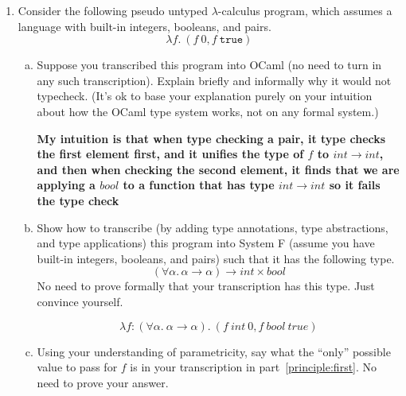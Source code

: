 \documentclass{article}
\theoremstyle{definition}
\newcommand{\meta}[1]{{\color{blue}#1}}
\begin{document}
\begin{enumerate}[start=1,label={{\bf Problem \arabic*}.},ref=\arabic*,left=0pt..0pt,widest*=10,align=left,itemindent=*]
\begin{proof}
\begin{itemize}
    \end{itemize}
  \end{proof}
  \begin{quote}
    If $\cdot;\cdot\vdash\meta{e}:\meta{\tau}$, then $FTV(\meta{\tau}) = \emptyset$.
  \end{quote}
  \begin{proof}
    Suppose $FTV(\meta{\tau}) \neq \emptyset$, then $\exists \meta{\beta} \in FTV(\meta{\tau})$. According to $\textit{Lemma 1-1}$, $\cdot\vdash\meta{\beta}$. However, $\meta{\Delta}$ in this case is an empty set, this contradicts with $\cdot\vdash\meta{\beta}$. Therefore, $FTV(\meta{\tau})$ must be $\emptyset$.
  \end{proof}

\item Consider the following pseudo untyped $\lambda$-calculus program, which assumes a language with built-in integers, booleans, and pairs.
  \[
    \lambda f.\ (f\ 0, f\ \mathtt{true})
  \]
  \begin{enumerate}[(a),left=1em]
  \item Suppose you transcribed this program into OCaml (no need to turn in any
    such transcription). Explain briefly and informally why it would not
    typecheck. (It's ok to base your explanation purely on your intuition about
    how the OCaml type system works, not on any formal system.)

    \textbf{My intuition is that when type checking a pair, it type checks the first element first, and it unifies the type of $f$ to $int\to int$, and then when checking the second element, it finds that we are applying a $bool$ to a function that has type $int\to int$ so it fails the type check}

  \item\label{principle:first} Show how to transcribe (by adding type
    annotations, type abstractions, and type applications) this program into
    System F (assume you have built-in integers, booleans, and pairs) such that
    it has the following type.
    \[
      (\forall\alpha.\, \alpha\to\alpha)\to int\times bool
    \]
    No need to prove formally that your transcription has this type. Just convince yourself.

    $$\lambda f:(\forall \alpha.\ \alpha \to \alpha).\ (f\ int\ 0, f\ bool\ true)$$

  \item Using your understanding of parametricity, say what the ``only''
    possible value to pass for $f$ is in your transcription in part~\ref{principle:first}.
    No need to prove your answer.


\end{enumerate}
\end{enumerate}
\end{document}
